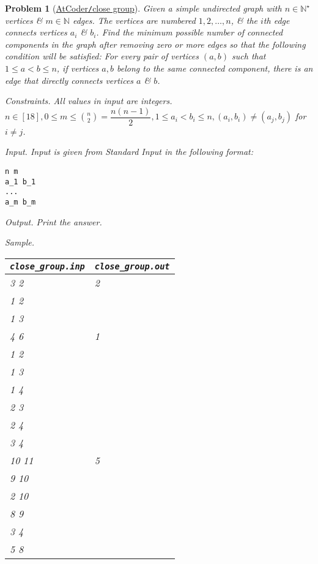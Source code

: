 \documentclass{article}
\newtheorem{problem}{Problem}
\begin{document}
\begin{problem}[\href{https://atcoder.jp/contests/abc187/tasks/abc187_f}{AtCoder{\tt/}close group}]
    Given a simple undirected graph with $n\in\mathbb{N}^\star$ vertices \& $m\in\mathbb{N}$ edges. The vertices are numbered $1,2,\ldots,n$, \& the $i$th edge connects vertices $a_i$ \& $b_i$. Find the minimum possible number of connected components in the graph after removing zero or more edges so that the following condition will be satisfied: For every pair of vertices $(a,b)$ such that $1\le a < b \le n$, if vertices $a,b$ belong to the same connected component, there is an edge that directly connects vertices $a$ \& $b$.
    \item {\sf Constraints.} All values in input are integers. $n\in[18],0\le m\le\binom{n}{2} =\dfrac{n(n - 1)}{2},1\le a_i < b_i\le n,(a_i,b_i)\ne(a_j,b_j)$ for $i\ne j$.
    \item {\sf Input.} Input is given from Standard Input in the following format:
    \begin{verbatim}
n m
a_1 b_1
...
a_m b_m
    \end{verbatim}
    \item {\sf Output.} Print the answer.
    \item {\sf Sample.}
    \begin{table}[H]
        \centering
        \begin{tabular}{|l|l|}
            \hline
            \verb|close_group.inp| & \verb|close_group.out| \\
            \hline
            3 2 & 2 \\
            1 2 & \\
            1 3 & \\
            \hline
            4 6 & 1 \\
            1 2 & \\
            1 3 & \\
            1 4 & \\
            2 3 & \\
            2 4 & \\
            3 4 & \\
            \hline
            10 11 & 5 \\
            9 10 & \\
            2 10 & \\
            8 9 & \\
            3 4 & \\
            5 8 & \\

\end{tabular}
\end{table}
\end{problem}
\end{document}

